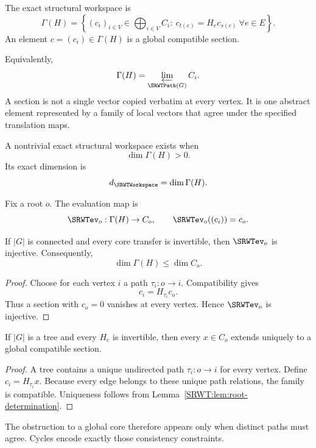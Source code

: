 \begin{SRWTdefinition}\label{SRWT:def:global-section}
The exact structural workspace is
\[
\boxed{
\Gamma(H)
=
\left\{
(c_i)_{i\in V}\in\bigoplus_{i\in V}C_i:
\ c_{t(e)}=H_ec_{s(e)}\ \forall e\in E
\right\}.
}
\]
An element \(c=(c_i)\in\Gamma(H)\) is a global compatible section.
\end{SRWTdefinition}

Equivalently,
\[
\Gamma(H)=\varprojlim_{\SRWTPath(G)}C_i.
\]
A section is not a single vector copied verbatim at every vertex. It is one
abstract element represented by a family of local vectors that agree under the
specified translation maps.

A nontrivial exact structural workspace exists when
\[
\dim\Gamma(H)>0.
\]
Its exact dimension is
\[
d_{\SRWTWorkspace}=\dim\Gamma(H).
\]

Fix a root \(o\). The evaluation map is
\[
\SRWTev_o:\Gamma(H)\to C_o,
\qquad
\SRWTev_o((c_i))=c_o.
\]

\begin{SRWTlemma}\label{SRWT:lem:root-determination}
If \(|G|\) is connected and every core transfer is invertible, then
\(\SRWTev_o\) is injective. Consequently,
\[
\dim\Gamma(H)\leq\dim C_o.
\]
\end{SRWTlemma}

\begin{proof}
Choose for each vertex \(i\) a path \(\tau_i:o\to i\). Compatibility gives
\[
c_i=H_{\tau_i}c_o.
\]
Thus a section with \(c_o=0\) vanishes at every vertex. Hence \(\SRWTev_o\) is
injective.
\end{proof}

\begin{SRWTlemma}\label{SRWT:lem:tree-propagation}
If \(|G|\) is a tree and every \(H_e\) is invertible, then every
\(x\in C_o\) extends uniquely to a global compatible section.
\end{SRWTlemma}

\begin{proof}
A tree contains a unique undirected path \(\tau_i:o\to i\) for every vertex.
Define \(c_i=H_{\tau_i}x\). Because every edge belongs to these unique path
relations, the family is compatible. Uniqueness follows from
Lemma~\ref{SRWT:lem:root-determination}.
\end{proof}

The obstruction to a global core therefore appears only when distinct paths
must agree. Cycles encode exactly those consistency constraints.

